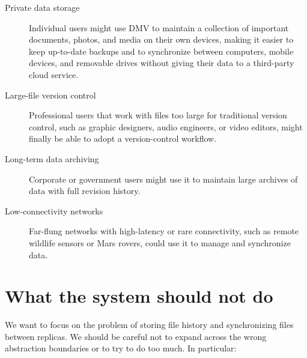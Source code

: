\begin{description}

    \item[Private data storage] Individual users might use \gls{DMV} to maintain
        a collection of important documents, photos, and media on their own
        devices, making it easier to keep up-to-date backups and to synchronize
        between computers, mobile devices, and removable drives without giving
        their data to a third-party cloud service.

    \item[Large-file version control] Professional users that work with files
        too large for traditional version control, such as graphic designers,
        audio engineers, or video editors, might finally be able to adopt a
        version-control workflow.

    \item[Long-term data archiving] Corporate or government users might use it
        to maintain large archives of data with full revision history.

    \item[Low-connectivity networks] Far-flung networks with high-latency or
        rare connectivity, such as remote wildlife sensors or Mars rovers, could
        use it to manage and synchronize data.

\end{description}

%


\section{What the system should not do}

We want to focus on the problem of storing file history and synchronizing files
between replicas.
We should be careful not to expand across the wrong abstraction boundaries or to
try to do too much.
In particular:

